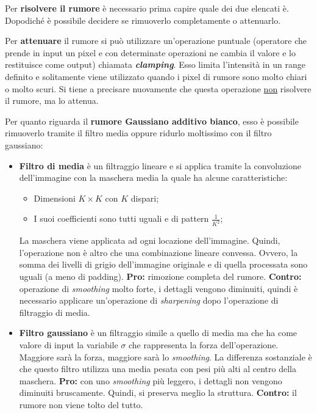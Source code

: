 \documentclass[a4paper]{article}
\begin{document}
	\noindent
	Per \textbf{risolvere il rumore} è necessario prima capire quale dei due elencati è. Dopodiché è possibile decidere se rimuoverlo completamente o attenuarlo.\newline
	
	\noindent
	Per \textbf{attenuare} il rumore si può utilizzare un'operazione puntuale (operatore che prende in input un pixel e con determinate operazioni ne cambia il valore e lo restituisce come output) chiamata \textbf{\emph{clamping}}. Esso limita l'intensità in un range definito e solitamente viene utilizzato quando i pixel di rumore sono molto chiari o molto scuri. Si tiene a precisare nuovamente che questa operazione \underline{non} risolvere il rumore, ma lo attenua.\newline
	
	\noindent
	Per quanto riguarda il \textbf{rumore Gaussiano additivo bianco}, esso è possibile rimuoverlo tramite il filtro media oppure ridurlo moltissimo con il filtro gaussiano:
	\begin{itemize}
		\item \textbf{Filtro di media} è un filtraggio lineare e si applica tramite la convoluzione dell'immagine con la maschera media la quale ha alcune caratteristiche:
		\begin{itemize}
			\item Dimensioni $K\times K$ con $K$ dispari;
			\item I suoi coefficienti sono tutti uguali e di pattern $\frac{1}{K^{2}}$;
		\end{itemize}
		La maschera viene applicata ad ogni locazione dell'immagine. Quindi, l'operazione non è altro che una combinazione lineare convessa. Ovvero, la somma dei livelli di grigio dell'immagine originale e di quella processata sono uguali (a meno di padding).\newline
		\textcolor{Green4}{\textbf{Pro:}} rimozione completa del rumore.\newline
		\textcolor{Red3}{\textbf{Contro:}} operazione di \emph{smoothing} molto forte, i dettagli vengono diminuiti, quindi è necessario applicare un'operazione di \emph{sharpening} dopo l'operazione di filtraggio di media.
		
		\item \textbf{Filtro gaussiano} è un filtraggio simile a quello di media ma che ha come valore di input la variabile $\sigma$ che rappresenta la forza dell'operazione. Maggiore sarà la forza, maggiore sarà lo \emph{smoothing}. La differenza sostanziale è che questo filtro utilizza una media pesata con pesi più alti al centro della maschera.\newline
		\textcolor{Green4}{\textbf{Pro:}} con uno \emph{smoothing} più leggero, i dettagli non vengono diminuiti bruscamente. Quindi, si preserva meglio la struttura.\newline
		\textcolor{Red3}{\textbf{Contro:}} il rumore non viene tolto del tutto.
	\end{itemize}\:\newline
\end{document}
